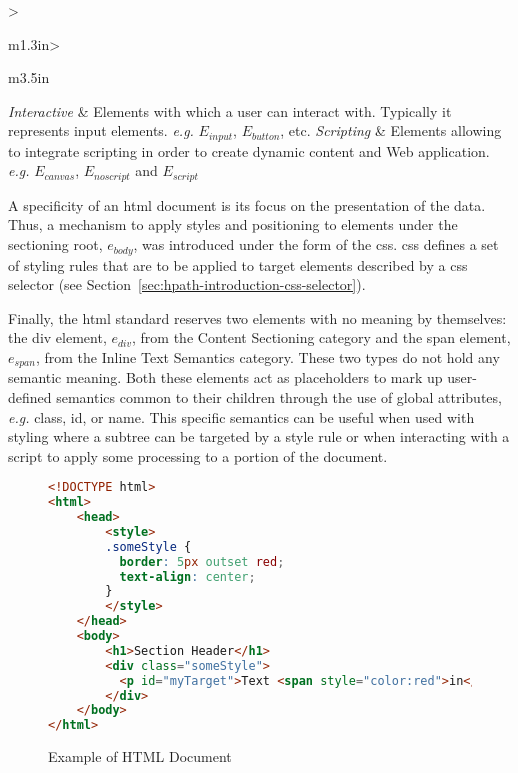 \begin{table}
\begin{tabular}{>{\raggedright}m{1.3in}>{\raggedright}m{3.5in}}
\scriptsize{\textit{Interactive}} & \scriptsize{Elements with which a user can interact with. Typically it represents input elements. \emph{e.g.} $E_{input}$, $E_{button}$, etc.} \tabularnewline
\scriptsize{\textit{Scripting}} & \scriptsize{Elements allowing to integrate scripting in order to create dynamic content and Web application. \emph{e.g.} $E_{canvas}$, $E_{noscript}$ and $E_{script}$} \tabularnewline
\bottomrule
\end{tabular}
\parnotes
\end{table}

A specificity of an \gls{html} document is its focus on the presentation of the data. Thus, a mechanism to apply styles and positioning to elements under the sectioning root, $e_{body}$, was introduced under the form of the \gls{css}. \gls{css} defines a set of styling rules that are to be applied to target elements described by a \gls{css} selector (see Section~\ref{sec:hpath-introduction-css-selector}).

Finally, the \gls{html} standard reserves two elements with no meaning by themselves: the div element, $e_{div}$, from the Content Sectioning category and the span element, $e_{span}$, from the Inline Text Semantics category. These two types do not hold any semantic meaning. Both these elements act as placeholders to mark up user-defined semantics common to their children through the use of global attributes, \emph{e.g.} class, id, or name. This specific semantics can be useful when used with styling where a subtree can be targeted by a style rule or when interacting with a script to apply some processing to a portion of the document.

\begin{figure}
\centering
\caption{Example of HTML Document}
\label{fig:html-document}
\begin{minipage}{0.8\linewidth}
\begin{lstlisting}[language=HTML]
<!DOCTYPE html>
<html>
    <head>
        <style>
        .someStyle {
          border: 5px outset red;
          text-align: center;
        }
        </style>
    </head>
    <body>
        <h1>Section Header</h1>
        <div class="someStyle">
          <p id="myTarget">Text <span style="color:red">in</span> a div.</p>
        </div>
    </body>
</html>
\end{lstlisting}
\end{minipage}
\end{figure}

